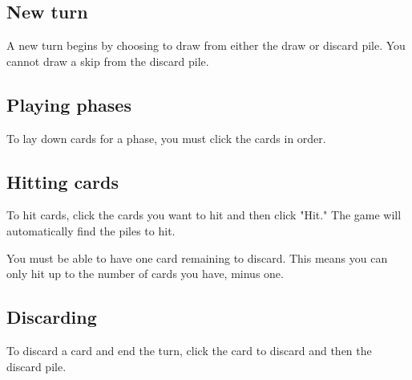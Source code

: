 \documentclass[12pt]{article}
\begin{document}
\subsection{New turn}
A new turn begins by choosing to draw from either the draw or discard pile.
You cannot draw a skip from the discard pile.

\subsection{Playing phases}
To lay down cards for a phase, you must click the cards in order.

\subsection{Hitting cards}
To hit cards, click the cards you want to hit and then click "Hit." The game will automatically find
the piles to hit.

You must be able to have one card remaining to discard.
This means you can only hit up to the number of cards you have, minus one.

\subsection{Discarding}
To discard a card and end the turn, click the card to discard and then the discard pile.
\end{document}
